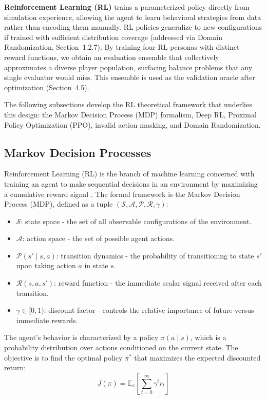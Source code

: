\textbf{Reinforcement Learning (RL)} trains a parameterized policy directly from simulation experience, allowing the agent to learn behavioral strategies from data rather than encoding them manually. RL policies generalize to new configurations if trained with sufficient distribution coverage (addressed via Domain Randomization, Section~1.2.7). By training four RL personas with distinct reward functions, we obtain an evaluation ensemble that collectively approximates a diverse player population, surfacing balance problems that any single evaluator would miss. This ensemble is used as the validation oracle after optimization (Section~4.5).

The following subsections develop the RL theoretical framework that underlies this design: the Markov Decision Process (MDP) formalism, Deep RL, Proximal Policy Optimization (PPO), invalid action masking, and Domain Randomization.

\subsection{Markov Decision Processes}

Reinforcement Learning (RL) is the branch of machine learning concerned with training an agent to make sequential decisions in an environment by maximizing a cumulative reward signal \cite{sutton2018reinforcement}. The formal framework is the Markov Decision Process (MDP), defined as a tuple $(\mathcal{S}, \mathcal{A}, \mathcal{P}, \mathcal{R}, \gamma)$:
\begin{itemize}
    \item $\mathcal{S}$: state space - the set of all observable configurations of the environment.
    \item $\mathcal{A}$: action space - the set of possible agent actions.
    \item $\mathcal{P}(s' \mid s, a)$: transition dynamics - the probability of transitioning to state $s'$ upon taking action $a$ in state $s$.
    \item $\mathcal{R}(s, a, s')$: reward function - the immediate scalar signal received after each transition.
    \item $\gamma \in [0, 1)$: discount factor - controls the relative importance of future versus immediate rewards.
\end{itemize}

The agent's behavior is characterized by a policy $\pi(a \mid s)$, which is a probability distribution over actions conditioned on the current state. The objective is to find the optimal policy $\pi^*$ that maximizes the expected discounted return:
\begin{equation}
J(\pi) = \mathbb{E}_\pi \left[ \sum_{t=0}^{\infty} \gamma^t r_t \right]
\end{equation}

